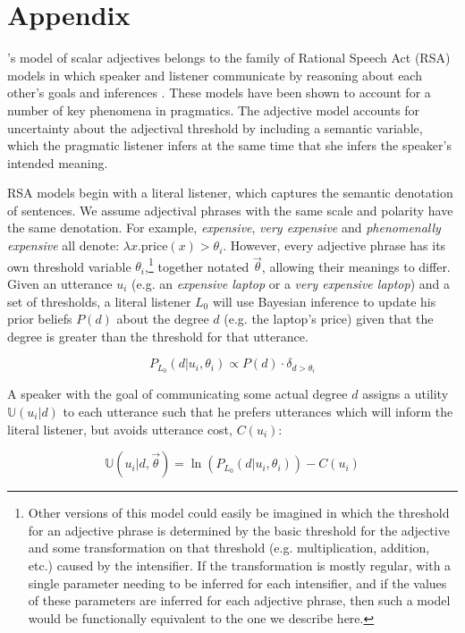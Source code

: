 \documentclass[10pt,letterpaper]{article}
\newcommand{\w}[1]{\emph{#1}}
\begin{document}
\section{Appendix} \label{app:model}

 's model of scalar adjectives belongs to the family of Rational Speech Act (RSA) models in which speaker and listener communicate by  reasoning about each other's goals and inferences \cite{frank, goodman}. These models have been shown to account for a number of key phenomena in pragmatics. The adjective model accounts for uncertainty about the adjectival threshold by including a semantic variable, which the pragmatic listener infers at the same time that she infers the speaker's intended meaning. 

RSA models begin with a literal listener, which captures the semantic denotation of sentences. 
We assume adjectival phrases with the same scale and polarity have the same denotation. For example, \w{expensive}, \w{very expensive} and \w{phenomenally expensive} all denote: $\lambda x . \text{price}(x) > \theta_i$. %
However, every adjective phrase has its own threshold variable $\theta_i$,\footnote{Other versions of this model could easily be imagined in which the threshold for an adjective phrase is determined by the basic threshold for the adjective and some transformation on that threshold (e.g. multiplication, addition, etc.) caused by the intensifier. If the transformation is mostly regular, with a single parameter needing to be inferred for each intensifier, and if the values of these parameters are inferred for each adjective phrase, then such a model would be functionally equivalent to the one we describe here.} together notated $\vec{\theta}$, allowing their meanings to differ.
Given an utterance $u_i$ (e.g. an \w{expensive laptop} or a \w{very expensive laptop}) and a set of thresholds, a literal listener $L_0$ will use Bayesian inference to update his prior beliefs $P(d)$ about the degree $d$ (e.g. the laptop's price) given that the degree is greater than the threshold for that utterance.

$$P_{L_0}(d|u_i, \theta_i) \propto P(d) \cdot \delta_{d > \theta_i}$$

A speaker with the goal of communicating some actual degree $d$ assigns a utility $\mathbb{U}(u_i|d)$ to each utterance such that he prefers utterances which will inform the literal listener, but avoids utterance cost, $C(u_i)$:

$$\mathbb{U}(u_i | d, \vec{\theta}) =  \ln\left(P_{L_0}(d | u_i, \theta_i) \right) - C(u_i) $$
\end{document}
